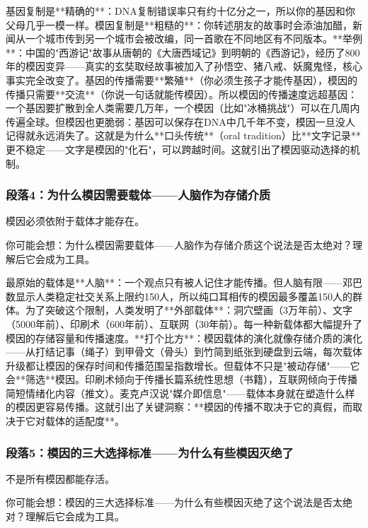 \documentclass[openany, a4paper, 12pt]{book}
\newenvironment{motivation}{
	\vspace{0.5em}
	\begin{tcolorbox}[
		colback=gray!10,           %
		colframe=gray!60,          %
		title=\textit{本章动机 (Motivation)},
		fonttitle=\bfseries,
		arc=0mm,                   %
		leftrule=3mm               %
		]
		\small \itshape %
	}{
	\end{tcolorbox}
	\vspace{1em}
}
\begin{document}
\begin{motivation}
\begin{motivation}
\begin{motivation}
基因复制是**精确的**：DNA复制错误率只有约十亿分之一，所以你的基因和你父母几乎一模一样。模因复制是**粗糙的**：你转述朋友的故事时会添油加醋，新闻从一个城市传到另一个城市会被改编，同一首歌在不同地区有不同版本。**举例**：中国的"西游记"故事从唐朝的《大唐西域记》到明朝的《西游记》，经历了800年的模因变异——真实的玄奘取经故事被加入了孙悟空、猪八戒、妖魔鬼怪，核心事实完全改变了。基因的传播需要**繁殖**（你必须生孩子才能传基因），模因的传播只需要**交流**（你说一句话就能传模因）。所以模因的传播速度远超基因：一个基因要扩散到全人类需要几万年，一个模因（比如"冰桶挑战"）可以在几周内传遍全球。但模因也更脆弱：基因可以保存在DNA中几千年不变，模因一旦没人记得就永远消失了。这就是为什么**口头传统**（oral tradition）比**文字记录**更不稳定——文字是模因的"化石"，可以跨越时间。这就引出了模因驱动选择的机制。

	\subsubsection*{段落4：为什么模因需要载体——人脑作为存储介质}
	模因必须依附于载体才能存在。
	\begin{tcolorbox}[colback=yellow!5, title=\textit{读者行为预测}]
		你可能会想：为什么模因需要载体——人脑作为存储介质这个说法是否太绝对？理解后它会成为工具。
	\end{tcolorbox}

最原始的载体是**人脑**：一个观点只有被人记住才能传播。但人脑有限——邓巴数显示人类稳定社交关系上限约150人，所以纯口耳相传的模因最多覆盖150人的群体。为了突破这个限制，人类发明了**外部载体**：洞穴壁画（3万年前）、文字（5000年前）、印刷术（600年前）、互联网（30年前）。每一种新载体都大幅提升了模因的存储容量和传播速度。**打个比方**：模因载体的演化就像存储介质的演化——从打结记事（绳子）到甲骨文（骨头）到竹简到纸张到硬盘到云端，每次载体升级都让模因的保存时间和传播范围呈指数增长。但载体不只是"被动存储"——它会**筛选**模因。印刷术倾向于传播长篇系统性思想（书籍），互联网倾向于传播简短情绪化内容（推文）。麦克卢汉说"媒介即信息"——载体本身就在塑造什么样的模因更容易传播。这就引出了关键洞察：**模因的传播不取决于它的真假，而取决于它对载体的适配度**。

	\subsubsection*{段落5：模因的三大选择标准——为什么有些模因灭绝了}
	不是所有模因都能存活。
	\begin{tcolorbox}[colback=yellow!5, title=\textit{读者行为预测}]
		你可能会想：模因的三大选择标准——为什么有些模因灭绝了这个说法是否太绝对？理解后它会成为工具。
	\end{tcolorbox}


\end{motivation}
\end{motivation}
\end{motivation}
\end{document}
